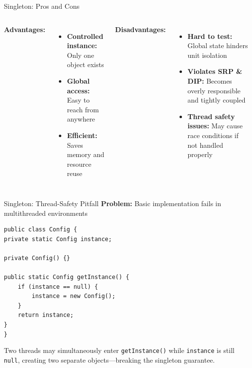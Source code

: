 \documentclass[aspectratio=169, table]{beamer}
\begin{document}
\begin{frame}[fragile]{Singleton: Pros and Cons}
\vspace{10pt}
\begin{columns}[T]
\textbf{Advantages:}
\begin{itemize}
\item \textbf{Controlled instance:} Only one object exists
\item \textbf{Global access:} Easy to reach from anywhere
\item \textbf{Efficient:} Saves memory and resource reuse
\end{itemize}

\textbf{Disadvantages:}
\begin{itemize}
\item \textbf{Hard to test:} Global state hinders unit isolation
\item \textbf{Violates SRP \& DIP:} Becomes overly responsible and tightly coupled
\item \textbf{Thread safety issues:} May cause race conditions if not handled properly
\end{itemize}
\end{columns}
\end{frame}

\begin{frame}[fragile]{Singleton: Thread-Safety Pitfall}
\vspace{10pt}
\textbf{Problem:} Basic implementation fails in multithreaded environments

\begin{lstlisting}[style=JavaStyle]
public class Config {
private static Config instance;

private Config() {}

public static Config getInstance() {
	if (instance == null) {
		instance = new Config();
	}
	return instance;
}
}
\end{lstlisting}

\vspace{5pt}
Two threads may simultaneously enter \texttt{getInstance()} while \texttt{instance} is still \texttt{null}, creating two separate objects—breaking the singleton guarantee.
\end{frame}
\end{document}
